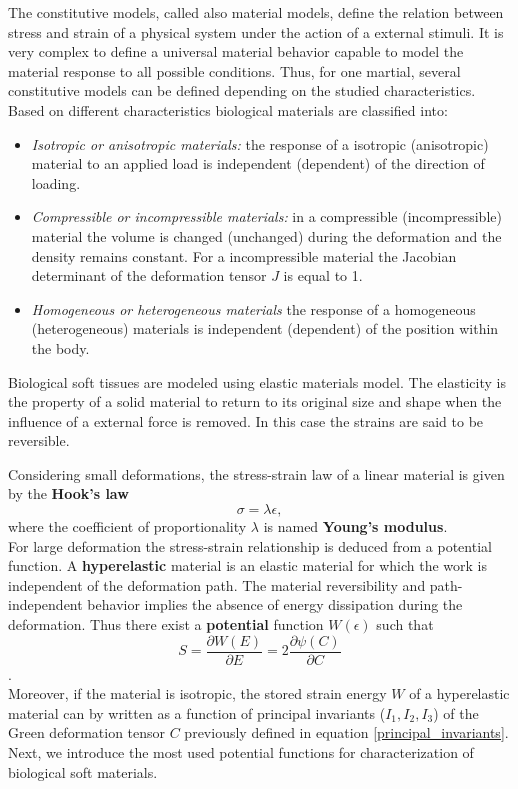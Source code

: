    The constitutive models, called also material models, define the relation between stress and strain of a physical system under the action of a external stimuli. It is very complex to define a universal material behavior capable to model the material response to all possible conditions. Thus, for one martial, several constitutive models can be defined depending on the studied characteristics. \\
	Based on different characteristics biological materials are classified into:
	\begin{itemize}
\item \textit{ Isotropic or anisotropic materials:} the response of a isotropic (anisotropic) material to an applied load is independent (dependent) of the direction of loading.
\item\textit{ Compressible or incompressible materials:} in a compressible (incompressible) material the volume is changed (unchanged) during the deformation and the density remains constant. For a incompressible material the Jacobian determinant of the deformation tensor $J$ is equal to 1. 
\item \textit{ Homogeneous or heterogeneous materials} the response of a homogeneous (heterogeneous) materials is independent (dependent) of the position within the body.
	\end{itemize}

Biological soft tissues are modeled using elastic materials model. The elasticity is the property of a solid material to return to its original size and shape when the influence of a external force is removed. In this case the strains are said to be reversible. 
	 
Considering small deformations, the stress-strain law of a linear material is given by the \textbf{Hook's law} $$\sigma = \lambda \epsilon,$$ where  the coefficient of proportionality $\lambda$ is named \textbf{Young's modulus}. \\
For large deformation the stress-strain relationship is deduced from a potential function. A \textbf{hyperelastic} material is an elastic material for which the work is independent of the deformation path. The material reversibility and path-independent behavior implies the absence of energy dissipation during the deformation. Thus there exist a \textbf{potential} function $W(\epsilon)$ such that $$S = \frac{\partial W(E)}{\partial E}= 2\frac{\partial \psi (C)}{\partial C}$$.\\
Moreover, if the material is isotropic, the stored strain energy $W$ of a hyperelastic material can by written as a function of principal invariants ($I_1, I_2, I_3$) of the Green deformation tensor $C$ previously defined in equation \ref{principal_invariants}. Next, we introduce the most used potential functions for characterization of biological soft materials.
 
